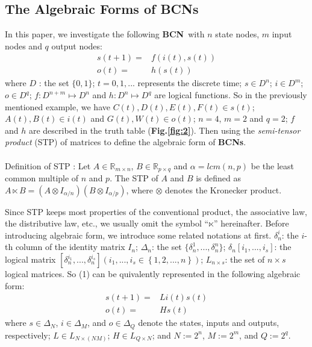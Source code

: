 \documentclass[letterpaper, 10 pt, conference]{ieeeconf}  %
\def \BCN {{\bf BCN}}
\begin{document}
\subsection{The Algebraic Forms of BCNs}
In this paper, we investigate the following \BCN\ with $n$ state nodes, $m$ input nodes and $q$ output nodes:
\begin{equation}
\begin{split}
s(t+1)=&f(i(t),s(t))\\
o(t)=&h(s(t))
\end{split}
\end{equation}
where $D$ : the set $\{0,1\}$; $t=0,1,...$ represents the discrete time; $s\in D^n$; $i\in D^m$; $o\in D^q$; $f:D^{n+m}\mapsto D^n$ and $h:D^n\mapsto D^q$ are logical functions. So in the previously mentioned example, we have $C(t), D(t), E(t), F(t)\in s(t)$; $A(t), B(t)\in i(t)$ and $G(t), W(t)\in o(t)$; $n=4$, $m=2$ and $q=2$; $f$ and $h$ are described in the truth table ({\bf Fig.\ref{fig:2}}). Then using the \emph{semi-tensor product}  (STP) of matrices to define the algebraic form of {\bf BCNs}. \\
\\
Definition of STP : Let $A\in\mathbb{R}_{m\times n}$, $B\in\mathbb{R}_{p\times q}$ and $\alpha=lcm(n,p)$ be the least common multiple of $n$ and $p$. The STP of $A$ and $B$ is defined as $A\ltimes B=(A\otimes I_{\alpha/n})(B\otimes I_{\alpha/p})$, where $\otimes$ denotes the Kronecker product. 

Since STP keeps most properties of the conventional product, the associative law, the distributive law, etc., we usually omit the symbol ``$\ltimes$'' hereinafter. Before introducing algebraic form, we introduce some related notations at first. $\delta^i_n$: the $i$-th column of the identity matrix $I_n$; $\Delta_n$: the set $\{\delta^1_n,...,\delta^n_n \}$; $\delta_n \left[i_1,...,i_s\right]$: the logical matrix $\left[\delta^{i_1}_n,...,\delta^{i_s}_n\right]\left(i_1,...,i_s\in\left\{1,2,...,n\right\}\right)$; $L_{n\times s}$: the set of $n\times s$ logical matrices. So (1) can be quivalently represented in the following algebraic form:
\begin{equation}
\begin{split}
s(t+1)=&Li(t)s(t)\\
o(t)=&Hs(t)
\end{split}
\end{equation}
where $s\in\Delta_N$, $i\in\Delta_M$, and  $o\in\Delta_Q$ denote the states, inputs and outputs, respectively; $L\in L_{N\times\left(NM\right)}$; $H\in L_{Q\times N}$; and $N:=2^n$, $M:=2^m$, and $Q:=2^q$.
\end{document}
